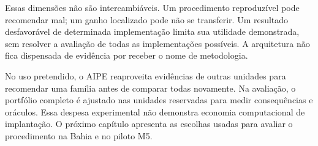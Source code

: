 Essas dimensões não são intercambiáveis. Um procedimento reproduzível pode recomendar mal; um ganho localizado pode não se transferir. Um resultado desfavorável de determinada implementação limita sua utilidade demonstrada, sem resolver a avaliação de todas as implementações possíveis. A arquitetura não fica dispensada de evidência por receber o nome de metodologia.

No uso pretendido, o AIPE reaproveita evidências de outras unidades para recomendar uma família antes de comparar todas novamente. Na avaliação, o portfólio completo é ajustado nas unidades reservadas para medir consequências e oráculos. Essa despesa experimental não demonstra economia computacional de implantação. O próximo capítulo apresenta as escolhas usadas para avaliar o procedimento na Bahia e no piloto M5.
